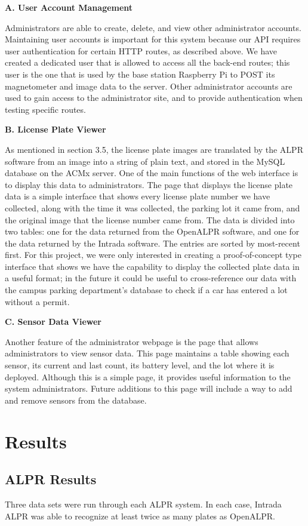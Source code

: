 \documentclass[11pt, oneside, fullpage, doublespace]{article}
\begin{document}
\textbf{A. User Account Management}

Administrators are able to create, delete, and view other administrator accounts. Maintaining user accounts is important for this system because our API requires user authentication for certain HTTP routes, as described above. We have created a dedicated user that is allowed to access all the back-end routes; this user is the one that is used by the base station Raspberry Pi to POST its magnetometer and image data to the server. Other administrator accounts are used to gain access to the administrator site, and to provide authentication when testing specific routes.

\textbf{B. License Plate Viewer}

As mentioned in section 3.5, the license plate images are translated by the ALPR software from an image into a string of plain text, and stored in the MySQL database on the ACMx server. One of the main functions of the web interface is to display this data to administrators. The page that displays the license plate data is a simple interface that shows every license plate number we have collected, along with the time it was collected, the parking lot it came from, and the original image that the license number came from. The data is divided into two tables: one for the data returned from the OpenALPR software, and one for the data returned by the Intrada software. The entries are sorted by most-recent first. For this project, we were only interested in creating a proof-of-concept type interface that shows we have the capability to display the collected plate data in a useful format; in the future it could be useful to cross-reference our data with the campus parking department's database to check if a car has entered a lot without a permit.

\textbf{C. Sensor Data Viewer}

Another feature of the administrator webpage is the page that allows administrators to view sensor data. This page maintains a table showing each sensor, its current and last count, its battery level, and the lot where it is deployed. Although this is a simple page, it provides useful information to the system administrators. Future additions to this page will include a way to add and remove sensors from the database.

\section{Results}
\subsection{ALPR Results}
Three data sets were run through each ALPR system. In each case, Intrada ALPR was able to recognize at least twice as many plates as OpenALPR.
\end{document}

